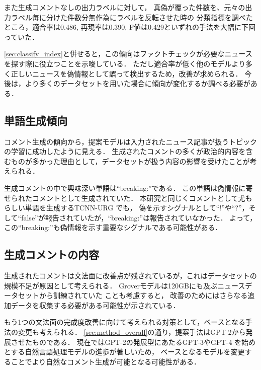 また生成コメントなしの出力ラベルに対して，
真偽が覆った件数を、元々の出力ラベル毎に分けた件数分無作為にラベルを反転させた時の
分類指標を調べたところ，適合率は0.486, 再現率は0.390, F値は0.429といずれの手法を大幅に下回っていた．

\cref{sec:classify_index}と併せると，この傾向はファクトチェックが必要なニュースを探す際に役立つことを示唆している．
ただし適合率が低く他のモデルより多く正しいニュースを偽情報として誤って検出するため，改善が求められる．
今後は，より多くのデータセットを用いた場合に傾向が変化するか調べる必要がある．

\subsection{単語生成傾向}
コメント生成の傾向から，提案モデルは入力されたニュース記事が扱うトピックの学習に成功したように見える．
生成されたコメントの多くが政治的内容を含むものが多かった理由として，データセットが扱う内容の影響を受けたことが考えられる．

生成コメントの中で興味深い単語は``breaking:''である．
この単語は偽情報に寄せられたコメントとして生成されていた．
本研究と同じくコメントとして尤もらしい単語を生成するTCNN-URG \cite{ijcai2018-533}でも，
偽を示すシグナルとして``!''や``?''，そして``false''が報告されていたが，``breaking:''は報告されていなかった．
よって，この``breaking:''も偽情報を示す重要なシグナルである可能性がある．

\subsection{生成コメントの内容}
生成されたコメントは文法面に改善点が残されているが，これはデータセットの規模不足が原因として考えられる．
Groverモデルは120GBにも及ぶニュースデータセットから訓練されていた \cite{DBLP:journals/corr/abs-1905-12616}ことも考慮すると，
改善のためにはさらなる追加データを収集する必要がある可能性が示されている．

もう1つの文法面の完成度改善に向けて考えられる対策として，ベースとなる手法の変更も考えられる．
\cref{sec:method_overall}の通り，提案手法はGPT-2から発展させたものである．
現在ではGPT-2の発展型にあたるGPT-3\cite{brown2020language}やGPT-4 \cite{openai2023gpt4}を始めとする自然言語処理モデルの進歩が著しいため，
ベースとなるモデルを変更することでより自然なコメント生成が可能となる可能性がある．
